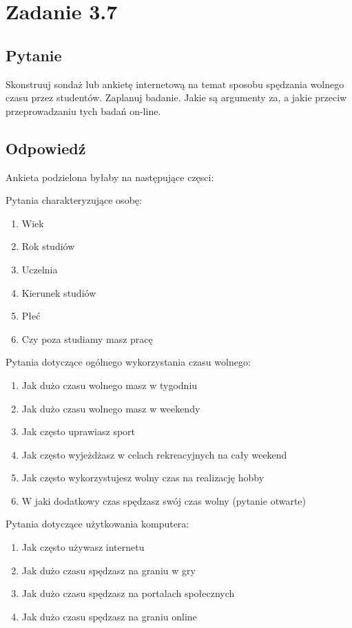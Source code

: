 \documentclass[paper=a4, fontsize=11pt]{scrartcl} %
\numberwithin{equation}{section} %
\numberwithin{figure}{section} %
\numberwithin{table}{section} %
\begin{document}
\section{Zadanie 3.7}

\subsection {Pytanie}

Skonstruuj sondaż lub ankietę internetową na temat sposobu spędzania wolnego czasu przez
studentów. Zaplanuj badanie. Jakie są argumenty za, a jakie przeciw przeprowadzaniu tych badań
on-line.

\subsection {Odpowiedź}

Ankieta podzielona byłaby na następujące częsci:

Pytania charakteryzujące osobę:
\begin{enumerate}
  \item Wiek
  \item Rok studiów 
  \item Uczelnia 
  \item Kierunek studiów 
  \item Płeć 
  \item Czy poza studiamy masz pracę 
\end{enumerate}

Pytania dotyczące ogólnego wykorzystania czasu wolnego:
\begin{enumerate}
  \item Jak dużo czasu wolnego masz w tygodniu
  \item Jak dużo czasu wolnego masz w weekendy
  \item Jak często uprawiasz sport
  \item Jak często wyjeżdżasz w celach rekreacyjnych na cały weekend
  \item Jak często wykorzystujesz wolny czas na realizację hobby
  \item W jaki dodatkowy czas spędzasz swój czas wolny (pytanie otwarte)
\end{enumerate}

Pytania dotyczące użytkowania komputera:
\begin{enumerate}
  \item Jak często używasz internetu
  \item Jak dużo czasu spędzasz na graniu w gry
  \item Jak dużo czasu spędzasz na portalach społecznych
  \item Jak dużo czasu spędzasz na graniu online
\end{enumerate}
\end{document}
